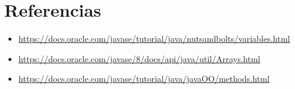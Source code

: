 \documentclass{article}
\begin{document}
\clearpage


\section{Referencias}
\begin{itemize}			
    \item \url{https://docs.oracle.com/javase/tutorial/java/nutsandbolts/variables.html}
    \item \url{https://docs.oracle.com/javase/8/docs/api/java/util/Arrays.html}
    \item \url{https://docs.oracle.com/javase/tutorial/java/javaOO/methods.html}
\end{itemize}	
	
%
%
%
			
\end{document}
